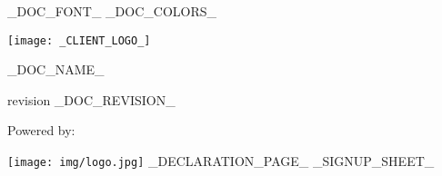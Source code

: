 _DOC_FONT_
_DOC_COLORS_

\pagestyle{fancy}
\fancyfoot[C]{}
\fancyfoot[R]{\footnotesize \thepage}

\texttt{[image: \_CLIENT\_LOGO\_]}

\vspace{80pt}

\centerline{\Huge _DOC_NAME_}

\vspace{40pt}

\centerline{\large revision _DOC_REVISION_}

\vspace{80pt}

\centerline{\huge Powered by:}
\texttt{[image: img/logo.jpg]}
_DECLARATION_PAGE_
_SIGNUP_SHEET_
\newpage